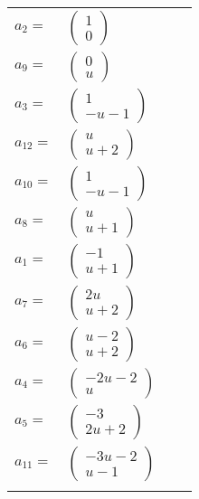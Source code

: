 \documentclass[1p]{elsarticle_modified}
\theoremstyle{definition}
\begin{document}
\begin{tabular}{m{7pt} m{180pt} m{7pt} m{180pt} }
\flushright $a_{2}=$&$\begin{pmatrix}1\\0\end{pmatrix}$ \\
\flushright $a_{9}=$&$\begin{pmatrix}0\\u\end{pmatrix}$ \\
\flushright $a_{3}=$&$\begin{pmatrix}1\\- u-1\end{pmatrix}$ \\
\flushright $a_{12}=$&$\begin{pmatrix}u\\u+2\end{pmatrix}$ \\
\flushright $a_{10}=$&$\begin{pmatrix}1\\- u-1\end{pmatrix}$ \\
\flushright $a_{8}=$&$\begin{pmatrix}u\\u+1\end{pmatrix}$ \\
\flushright $a_{1}=$&$\begin{pmatrix}-1\\u+1\end{pmatrix}$ \\
\flushright $a_{7}=$&$\begin{pmatrix}2 u\\u+2\end{pmatrix}$ \\
\flushright $a_{6}=$&$\begin{pmatrix}u-2\\u+2\end{pmatrix}$ \\
\flushright $a_{4}=$&$\begin{pmatrix}-2 u-2\\u\end{pmatrix}$ \\
\flushright $a_{5}=$&$\begin{pmatrix}-3\\2 u+2\end{pmatrix}$ \\
\flushright $a_{11}=$&$\begin{pmatrix}-3 u-2\\u-1\end{pmatrix}$\\&\end{tabular}
\end{document}
